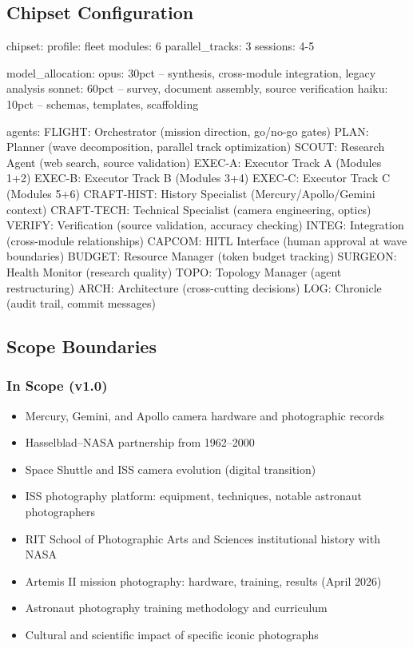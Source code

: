 \documentclass[11pt,letterpaper]{article}
\begin{document}
\subsection{Chipset Configuration}

\begin{asciibox}
chipset:
  profile: fleet
  modules: 6
  parallel_tracks: 3
  sessions: 4-5
  
  model_allocation:
    opus:   30pct  -- synthesis, cross-module integration, legacy analysis
    sonnet: 60pct  -- survey, document assembly, source verification
    haiku:  10pct  -- schemas, templates, scaffolding
  
  agents:
    FLIGHT:     Orchestrator (mission direction, go/no-go gates)
    PLAN:       Planner (wave decomposition, parallel track optimization)
    SCOUT:      Research Agent (web search, source validation)
    EXEC-A:     Executor Track A (Modules 1+2)
    EXEC-B:     Executor Track B (Modules 3+4)
    EXEC-C:     Executor Track C (Modules 5+6)
    CRAFT-HIST: History Specialist (Mercury/Apollo/Gemini context)
    CRAFT-TECH: Technical Specialist (camera engineering, optics)
    VERIFY:     Verification (source validation, accuracy checking)
    INTEG:      Integration (cross-module relationships)
    CAPCOM:     HITL Interface (human approval at wave boundaries)
    BUDGET:     Resource Manager (token budget tracking)
    SURGEON:    Health Monitor (research quality)
    TOPO:       Topology Manager (agent restructuring)
    ARCH:       Architecture (cross-cutting decisions)
    LOG:        Chronicle (audit trail, commit messages)
\end{asciibox}

\subsection{Scope Boundaries}

\subsubsection{In Scope (v1.0)}
\begin{itemize}[leftmargin=1.5em]
  \item Mercury, Gemini, and Apollo camera hardware and photographic records
  \item Hasselblad--NASA partnership from 1962--2000
  \item Space Shuttle and ISS camera evolution (digital transition)
  \item ISS photography platform: equipment, techniques, notable astronaut photographers
  \item RIT School of Photographic Arts and Sciences institutional history with NASA
  \item Artemis II mission photography: hardware, training, results (April 2026)
  \item Astronaut photography training methodology and curriculum
  \item Cultural and scientific impact of specific iconic photographs
\end{itemize}
\end{document}
